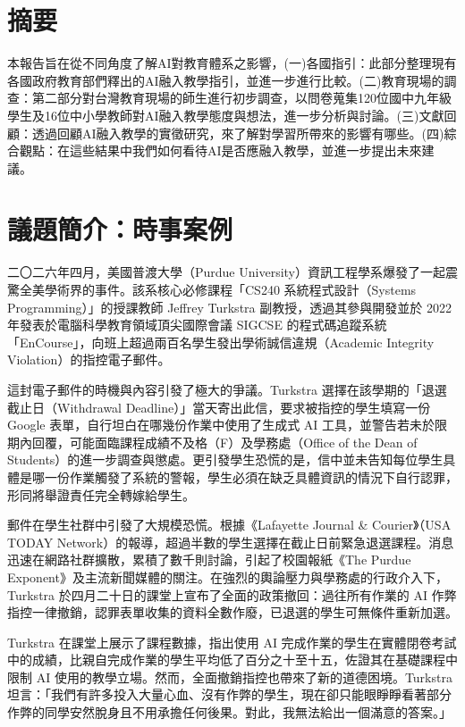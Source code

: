 \section{摘要}\label{sec:摘要}

本報告旨在從不同角度了解AI對教育體系之影響，(一)各國指引：此部分整理現有各國政府教育部們釋出的AI融入教學指引，並進一步進行比較。(二)教育現場的調查：第二部分對台灣教育現場的師生進行初步調查，以問卷蒐集120位國中九年級學生及16位中小學教師對AI融入教學態度與想法，進一步分析與討論。(三)文獻回顧：透過回顧AI融入教學的實徵研究，來了解對學習所帶來的影響有哪些。(四)綜合觀點：在這些結果中我們如何看待AI是否應融入教學，並進一步提出未來建議。

\section{議題簡介：時事案例}\label{sec:時事案例}

二〇二六年四月，美國普渡大學（Purdue University）資訊工程學系爆發了一起震驚全美學術界的事件。該系核心必修課程「CS240 系統程式設計（Systems Programming）」的授課教師 Jeffrey Turkstra 副教授，透過其參與開發並於 2022 年發表於電腦科學教育領域頂尖國際會議 SIGCSE 的程式碼追蹤系統「EnCourse」\cite{rodriguez2022tracking}，向班上超過兩百名學生發出學術誠信違規（Academic Integrity Violation）的指控電子郵件\cite{arun2026ai,lafayette2026cheating}。

這封電子郵件的時機與內容引發了極大的爭議。Turkstra 選擇在該學期的「退選截止日（Withdrawal Deadline）」當天寄出此信，要求被指控的學生填寫一份 Google 表單，自行坦白在哪幾份作業中使用了生成式 AI 工具，並警告若未於限期內回覆，可能面臨課程成績不及格（F）及學務處（Office of the Dean of Students）的進一步調查與懲處\cite{arun2026ai,lafayette2026cheating}。更引發學生恐慌的是，信中並未告知每位學生具體是哪一份作業觸發了系統的警報，學生必須在缺乏具體資訊的情況下自行認罪，形同將舉證責任完全轉嫁給學生\cite{arun2026ai,bailey2026cheating}。

郵件在學生社群中引發了大規模恐慌。根據《Lafayette Journal \& Courier》（USA TODAY Network）的報導，超過半數的學生選擇在截止日前緊急退選課程\cite{lafayette2026cheating}。消息迅速在網路社群擴散，累積了數千則討論，引起了校園報紙《The Purdue Exponent》及主流新聞媒體的關注\cite{arun2026ai,lafayette2026cheating}。在強烈的輿論壓力與學務處的行政介入下，Turkstra 於四月二十日的課堂上宣布了全面的政策撤回：過往所有作業的 AI 作弊指控一律撤銷，認罪表單收集的資料全數作廢，已退選的學生可無條件重新加選\cite{arun2026ai}。

Turkstra 在課堂上展示了課程數據，指出使用 AI 完成作業的學生在實體閉卷考試中的成績，比親自完成作業的學生平均低了百分之十至十五，佐證其在基礎課程中限制 AI 使用的教學立場\cite{arun2026ai}。然而，全面撤銷指控也帶來了新的道德困境。Turkstra 坦言：「我們有許多投入大量心血、沒有作弊的學生，現在卻只能眼睜睜看著部分作弊的同學安然脫身且不用承擔任何後果。對此，我無法給出一個滿意的答案。」\cite{arun2026ai}

